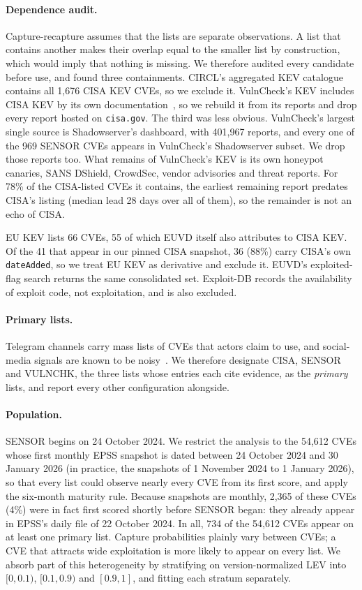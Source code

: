 \paragraph{Dependence audit.} Capture-recapture assumes that the lists are
separate observations. A list that contains another makes their overlap equal
to the smaller list by construction, which would imply that nothing is missing.
We therefore audited every candidate before use, and found three containments.
CIRCL's aggregated KEV catalogue contains all 1,676 CISA KEV CVEs, so we exclude
it. VulnCheck's KEV includes CISA KEV by its own
documentation~\cite{vulncheck2026kev}, so we rebuild it from its reports and
drop every report hosted on \texttt{cisa.gov}. The third was less obvious.
VulnCheck's largest single source is Shadowserver's dashboard, with 401,967
reports, and every one of the 969 SENSOR CVEs appears in VulnCheck's
Shadowserver subset. We drop those reports too. What remains of VulnCheck's KEV
is its own honeypot canaries, SANS DShield, CrowdSec, vendor advisories and
threat reports. For 78\% of the CISA-listed CVEs it contains, the earliest
remaining report predates CISA's listing (median lead 28 days over all of
them), so the remainder is not an echo of CISA.

EU KEV lists 66 CVEs, 55 of which EUVD itself also attributes to CISA KEV. Of
the 41 that appear in our pinned CISA snapshot, 36 (88\%) carry CISA's own
\texttt{dateAdded}, so we treat EU KEV as derivative and exclude it. EUVD's
exploited-flag search returns the same consolidated set. Exploit-DB records the
availability of exploit code, not exploitation, and is also excluded.

\paragraph{Primary lists.} Telegram channels carry mass lists of CVEs that
actors claim to use, and social-media signals are known to be
noisy~\cite{sabottke2015twitter}. We therefore designate CISA, SENSOR and
VULNCHK, the three lists whose entries each cite evidence, as the
\emph{primary} lists, and report every other configuration alongside.

\paragraph{Population.} SENSOR begins on 24 October 2024. We restrict the
analysis to the 54,612 CVEs whose first monthly EPSS snapshot is dated between
24 October 2024 and 30 January 2026 (in practice, the snapshots of 1 November
2024 to 1 January 2026), so that every list could observe nearly every CVE from
its first score, and apply the six-month maturity rule. Because snapshots are
monthly, 2,365 of these CVEs (4\%) were in fact first scored shortly before
SENSOR began: they already appear in EPSS's daily file of 22 October 2024. In all, 734 of the 54,612 CVEs appear on at least
one primary list. Capture probabilities plainly vary between CVEs; a CVE that
attracts wide exploitation is more likely to appear on every list. We absorb
part of this heterogeneity by stratifying on version-normalized LEV into
$[0, 0.1)$, $[0.1, 0.9)$ and $[0.9, 1]$, and fitting each stratum separately.

